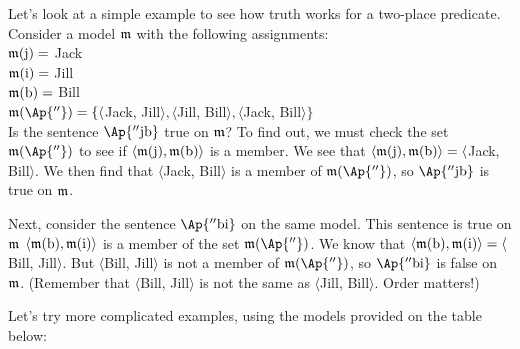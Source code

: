 \noindent{}Let's look at a simple example to see how \GQL{} truth works for a two-place predicate.  Consider a model $\mathfrak{m}$ with the following assignments:\\

\noindent{}$\mathfrak{m}(\mathrm{j})=$ Jack\\
\noindent{}$\mathfrak{m}(\mathrm{i})=$ Jill\\
\noindent{}$\mathfrak{m}(\mathrm{b})=$ Bill\\
\noindent{}$\IntA(\Ap{''})=\{\langle$Jack, Jill$\rangle, \langle$Jill, Bill$\rangle, \langle$Jack, Bill$\rangle\}$\\

\noindent{}Is the \GQL{} sentence $\Ap{''\constant{j}\constant{b}}$ true on $\mathfrak{m}$?  To find out, we must check the set $\IntA(\Ap{''})$ to see if $\langle\mathfrak{m}(\mathrm{j}),\mathfrak{m}(\mathrm{b})\rangle$ is a member.  We see that $\langle\mathfrak{m}(\mathrm{j}),\mathfrak{m}(\mathrm{b})\rangle=\langle$Jack, Bill$\rangle$.  We then find that $\langle$Jack, Bill$\rangle$ is a member of $\IntA(\Ap{''})$, so $\Ap{''\constant{j}\constant{b}}$ is true on $\mathfrak{m}$.

Next, consider the sentence $\Ap{''\constant{b}\constant{i}}$ on the same model.  This sentence is true on $\mathfrak{m}$ \Iff $\langle\mathfrak{m}(\mathrm{b}),\mathfrak{m}(\mathrm{i})\rangle$ is a member of the set $\IntA(\Ap{''})$.  We know that $\langle\mathfrak{m}(\mathrm{b}),\mathfrak{m}(\mathrm{i})\rangle=\langle$Bill, Jill$\rangle$.  But $\langle$Bill, Jill$\rangle$ is not a member of $\IntA(\Ap{''})$, so $\Ap{''\constant{b}\constant{i}}$ is false on $\mathfrak{m}$.  (Remember that $\langle$Bill, Jill$\rangle$ is not the same as $\langle$Jill, Bill$\rangle$.  Order matters!)

Let's try more complicated examples, using the models provided on the table below:

